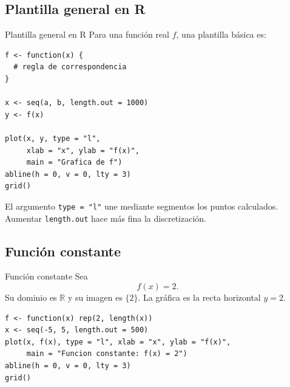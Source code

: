 \documentclass[aspectratio=169,10pt]{beamer}
\newcommand{\R}{\mathbb{R}}
\begin{document}
\subsection*{Plantilla general en R}
\begin{frame}{Plantilla general en R}
Para una función real $f$, una plantilla básica es:

\begin{verbatim}
f <- function(x) {
  # regla de correspondencia
}

x <- seq(a, b, length.out = 1000)
y <- f(x)

plot(x, y, type = "l",
     xlab = "x", ylab = "f(x)",
     main = "Grafica de f")
abline(h = 0, v = 0, lty = 3)
grid()
\end{verbatim}

El argumento \texttt{type = "l"} une mediante segmentos los puntos calculados.
Aumentar \texttt{length.out} hace más fina la discretización.

\end{frame}
\subsection*{Función constante}
\begin{frame}{Función constante}
Sea
\[
f(x)=2.
\]
Su dominio es $\R$ y su imagen es $\{2\}$. La gráfica es la recta horizontal
$y=2$.

\begin{center}
\end{center}

\begin{verbatim}
f <- function(x) rep(2, length(x))
x <- seq(-5, 5, length.out = 500)
plot(x, f(x), type = "l", xlab = "x", ylab = "f(x)",
     main = "Funcion constante: f(x) = 2")
abline(h = 0, v = 0, lty = 3)
grid()
\end{verbatim}

\end{frame}
\end{document}
